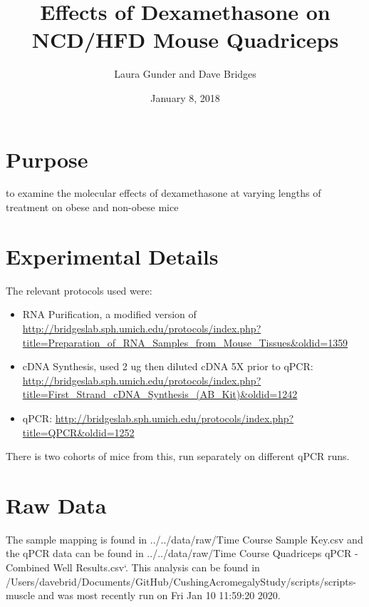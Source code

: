 \documentclass[]{article}
\title{Effects of Dexamethasone on NCD/HFD Mouse Quadriceps}
\author{Laura Gunder and Dave Bridges}
\date{January 8, 2018}
\providecommand{\tightlist}{%
  \setlength{\itemsep}{0pt}\setlength{\parskip}{0pt}}
\begin{document}
\maketitle

{
\setcounter{tocdepth}{2}
\tableofcontents
}
\section{Purpose}\label{purpose}

to examine the molecular effects of dexamethasone at varying lengths of
treatment on obese and non-obese mice

\section{Experimental Details}\label{experimental-details}

The relevant protocols used were:

\begin{itemize}
\tightlist
\item
  RNA Purification, a modified version of
  \url{http://bridgeslab.sph.umich.edu/protocols/index.php?title=Preparation_of_RNA_Samples_from_Mouse_Tissues\&oldid=1359}
\item
  cDNA Synthesis, used 2 ug then diluted cDNA 5X prior to qPCR:
  \url{http://bridgeslab.sph.umich.edu/protocols/index.php?title=First_Strand_cDNA_Synthesis_(AB_Kit)\&oldid=1242}
\item
  qPCR:
  \url{http://bridgeslab.sph.umich.edu/protocols/index.php?title=QPCR\&oldid=1252}
\end{itemize}

There is two cohorts of mice from this, run separately on different qPCR
runs.

\section{Raw Data}\label{raw-data}

The sample mapping is found in ../../data/raw/Time Course Sample Key.csv
and the qPCR data can be found in ../../data/raw/Time Course Quadriceps
qPCR - Combined Well Results.csv`. This analysis can be found in
/Users/davebrid/Documents/GitHub/CushingAcromegalyStudy/scripts/scripts-muscle
and was most recently run on Fri Jan 10 11:59:20 2020.
\end{document}
